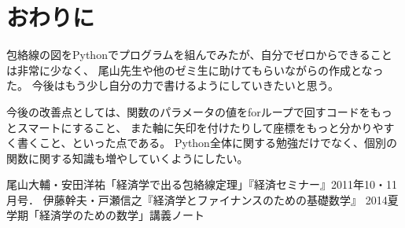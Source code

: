 \documentclass[11pt,a4j,fleqn]{jarticle}
\begin{document}
\section{おわりに}
包絡線の図をPythonでプログラムを組んでみたが、自分でゼロからできることは非常に少なく、
尾山先生や他のゼミ生に助けてもらいながらの作成となった。
今後はもう少し自分の力で書けるようにしていきたいと思う。

今後の改善点としては、関数のパラメータの値をforループで回すコードをもっとスマートにすること、
また軸に矢印を付けたりして座標をもっと分かりやすく書くこと、といった点である。
Python全体に関する勉強だけでなく、個別の関数に関する知識も増やしていくようにしたい。

\begin{thebibliography}{0}
尾山大輔・安田洋祐「経済学で出る包絡線定理」『経済セミナー』2011年10・11月号．
伊藤幹夫・戸瀬信之『経済学とファイナンスのための基礎数学』
2014夏学期「経済学のための数学」講義ノート
\end{thebibliography}
\end{document}
